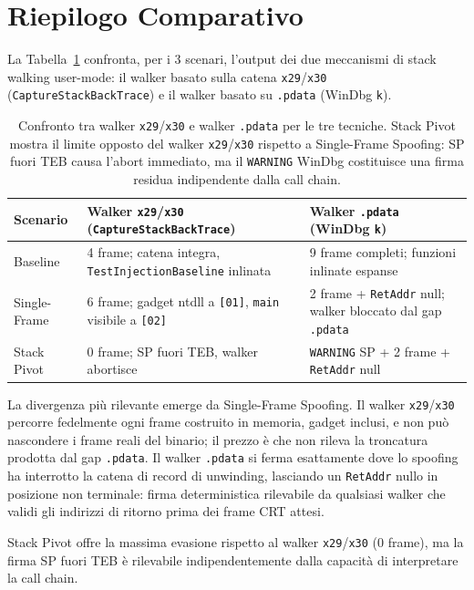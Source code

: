 
\section{Riepilogo Comparativo}
\label{sec:riepilogo-scenari}

La Tabella~\ref{tab:riepilogo} confronta, per i 3 scenari, l'output dei due
meccanismi di stack walking user-mode: il walker basato sulla catena
\texttt{x29}/\texttt{x30} (\texttt{CaptureStackBackTrace}) e il walker basato
su \texttt{.pdata} (WinDbg \texttt{k}).

\begin{table}[H]
\centering
\small
\begin{tabular}{p{2.8cm}p{5.2cm}p{5.2cm}}
\toprule
Scenario
  & Walker \texttt{x29}/\texttt{x30} (\texttt{CaptureStackBackTrace})
  & Walker \texttt{.pdata} (WinDbg \texttt{k}) \\
\midrule
Baseline
  & 4 frame; catena integra, \texttt{TestInjectionBaseline} inlinata
  & 9 frame completi; funzioni inlinate espanse \\
\addlinespace
Single-Frame
  & 6 frame; gadget ntdll a \texttt{[01]}, \texttt{main} visibile a \texttt{[02]}
  & 2 frame + \texttt{RetAddr} null; walker bloccato dal gap \texttt{.pdata} \\
\addlinespace
Stack Pivot
  & 0 frame; SP fuori TEB, walker abortisce
  & \texttt{WARNING} SP + 2 frame + \texttt{RetAddr} null \\
\bottomrule
\end{tabular}
\caption{Confronto tra walker \texttt{x29}/\texttt{x30} e walker \texttt{.pdata}
         per le tre tecniche. Stack Pivot mostra il limite opposto del walker
         \texttt{x29}/\texttt{x30} rispetto a Single-Frame Spoofing: SP fuori TEB causa
         l'abort immediato, ma il \texttt{WARNING} WinDbg costituisce una firma
         residua indipendente dalla call chain.}
\label{tab:riepilogo}
\end{table}

La divergenza più rilevante emerge da Single-Frame Spoofing. Il walker
\texttt{x29}/\texttt{x30} percorre fedelmente ogni frame costruito in memoria, gadget inclusi, e non può nascondere i frame reali del binario; il prezzo
è che non rileva la troncatura prodotta dal gap \texttt{.pdata}. Il walker
\texttt{.pdata} si ferma esattamente dove lo spoofing ha interrotto la catena
di record di unwinding, lasciando un \texttt{RetAddr} nullo in posizione non
terminale: firma deterministica rilevabile da qualsiasi walker che validi gli
indirizzi di ritorno prima dei frame CRT attesi.

Stack Pivot offre la massima evasione rispetto al walker
\texttt{x29}/\texttt{x30} (0 frame), ma la firma SP fuori TEB è rilevabile
indipendentemente dalla capacità di interpretare la call chain.

